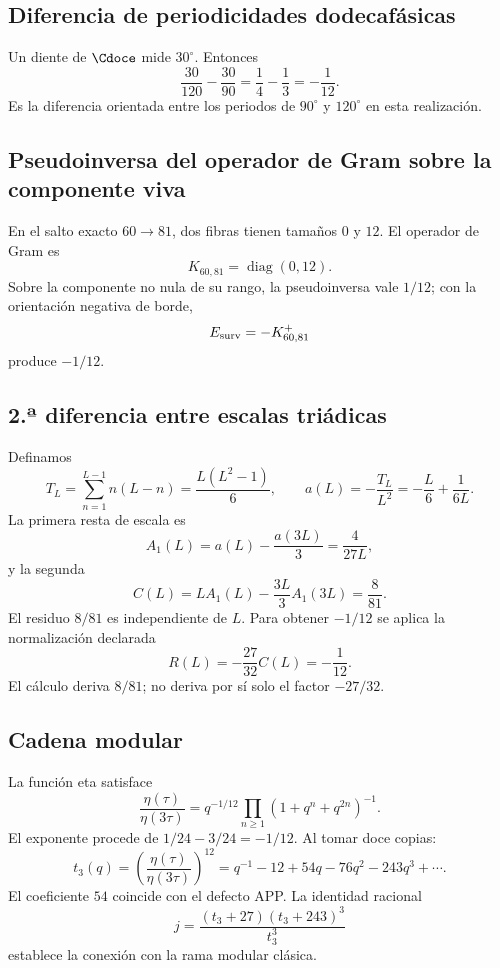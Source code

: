 \subsection{Diferencia de periodicidades dodecafásicas}

Un diente de \(\Cdoce\) mide \(30^\circ\). Entonces
\[
\frac{30}{120}-\frac{30}{90}
=\frac14-\frac13
=-\frac1{12}.
\]
Es la diferencia orientada entre los periodos de \(90^\circ\) y
\(120^\circ\) en esta realización.

\subsection{Pseudoinversa del operador de Gram sobre la componente viva}

En el salto exacto \(60\to81\), dos fibras tienen tamaños \(0\) y
\(12\). El operador de Gram es
\[
K_{60,81}=\operatorname{diag}(0,12).
\]
Sobre la componente no nula de su rango, la pseudoinversa vale \(1/12\); con la orientación
negativa de borde,
\[
E_{\rm surv}=-K_{60,81}^{+}
\]
produce \(-1/12\).

\subsection{2.ª diferencia entre escalas triádicas}
\label{sec:c27-segunda-diferencia-triadica}

Definamos
\[
T_L=\sum_{n=1}^{L-1}n(L-n)=\frac{L(L^2-1)}6,
\qquad
a(L)=-\frac{T_L}{L^2}=-\frac L6+\frac1{6L}.
\]
La primera resta de escala es
\[
A_1(L)=a(L)-\frac{a(3L)}3=\frac4{27L},
\]
y la segunda
\[
C(L)=LA_1(L)-\frac{3L}{3}A_1(3L)=\frac8{81}.
\]
El residuo \(8/81\) es independiente de \(L\). Para obtener
\(-1/12\) se aplica la normalización declarada
\[
R(L)=-\frac{27}{32}C(L)=-\frac1{12}.
\]
El cálculo deriva \(8/81\); no deriva por sí solo el factor \(-27/32\).

\subsection{Cadena modular}

La función eta satisface
\[
\frac{\eta(\tau)}{\eta(3\tau)}
=q^{-1/12}\prod_{n\ge1}(1+q^n+q^{2n})^{-1}.
\]
El exponente procede de \(1/24-3/24=-1/12\). Al tomar doce copias:
\[
t_3(q)=\left(\frac{\eta(\tau)}{\eta(3\tau)}\right)^{12}
=q^{-1}-12+54q-76q^2-243q^3+\cdots.
\]
El coeficiente \(54\) coincide con el defecto APP\@. La identidad racional
\[
j=\frac{(t_3+27)(t_3+243)^3}{t_3^3}
\]
establece la conexión con la rama modular clásica.

